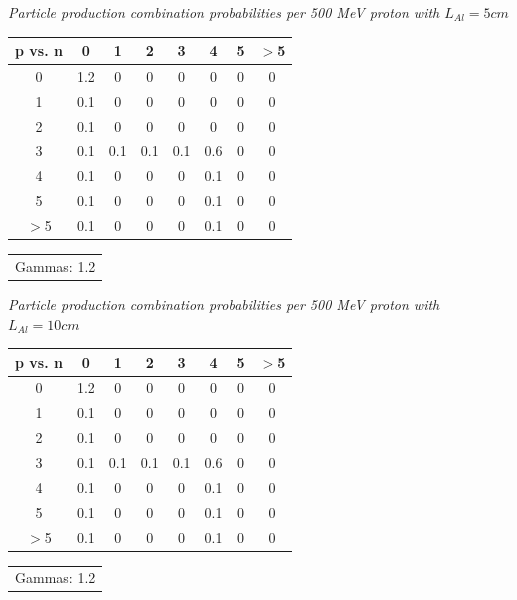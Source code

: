 \documentclass[11pt]{article}
\makeatletter
\newenvironment{tablehere}
{\def\@captype{table}}{}
\makeatother
\begin{document}
\begin{multicols}{2}
\vspace{0.15 cm}
\begin{tablehere}\begin{centering}
  \caption{\small \emph{Particle production combination probabilities per 500 MeV proton with $L_{Al}=5 cm$}}
  \begin{tabular}{c || c c c c c c c}
    p vs. n & 0 & 1 & 2 & 3 & 4 & 5 & $>$5 \\
    \hline\hline
    0 & 1.2 & 0 & 0 & 0 & 0 & 0 & 0 \\
    1 & 0.1 & 0 & 0 & 0 & 0 & 0 & 0 \\
    2 & 0.1 & 0 & 0 & 0 & 0 & 0 & 0 \\
    3 & 0.1 & 0.1 & 0.1 & 0.1 & 0.6 & 0 & 0 \\
    4 & 0.1 & 0 & 0 & 0 & 0.1 & 0 & 0 \\
    5 & 0.1 & 0 & 0 & 0 & 0.1 & 0 & 0 \\
    $>$5 & 0.1 & 0 & 0 & 0 & 0.1 & 0 & 0 \\
    \hline\hline
  \end{tabular}
  \begin{tabular}{r} Gammas: 1.2 \end{tabular}  
  \label{tab:production_pAl5}
\end{centering}\end{tablehere}
\vspace{0.15 cm}
\begin{tablehere}\begin{centering}
  \caption{\small \emph{Particle production combination probabilities per 500 MeV proton with $L_{Al}=10 cm$}}
  \begin{tabular}{c || c c c c c c c}
    p vs. n & 0 & 1 & 2 & 3 & 4 & 5 & $>$5 \\
    \hline\hline
    0 & 1.2 & 0 & 0 & 0 & 0 & 0 & 0 \\
    1 & 0.1 & 0 & 0 & 0 & 0 & 0 & 0 \\
    2 & 0.1 & 0 & 0 & 0 & 0 & 0 & 0 \\
    3 & 0.1 & 0.1 & 0.1 & 0.1 & 0.6 & 0 & 0 \\
    4 & 0.1 & 0 & 0 & 0 & 0.1 & 0 & 0 \\
    5 & 0.1 & 0 & 0 & 0 & 0.1 & 0 & 0 \\
    $>$5 & 0.1 & 0 & 0 & 0 & 0.1 & 0 & 0 \\
    \hline\hline
  \end{tabular}
  \begin{tabular}{r} Gammas: 1.2 \end{tabular}  

\end{centering}
\end{tablehere}
\end{multicols}
\end{document}
